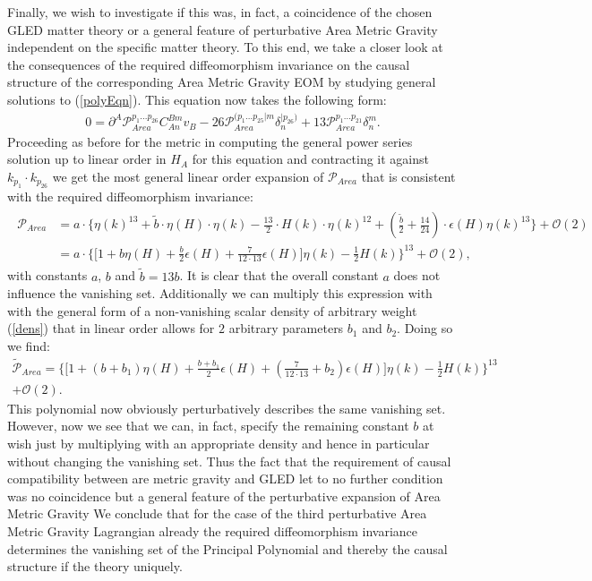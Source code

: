 \documentclass[a4paper,12pt, DIV=14, BCOR=5mm, twoside, headsepline, numbers=noenddot]{scrbook}
\begin{document}
Finally, we wish to investigate if this was, in fact, a coincidence of the chosen GLED matter theory or a general feature of perturbative Area Metric Gravity independent on the specific matter theory. To this end, we take a closer look at the consequences of the required diffeomorphism invariance on the causal structure of the corresponding Area Metric Gravity EOM by studying general solutions to (\ref{polyEqn}). This equation now takes the following form:
\begin{align}\label{AreaPolyEqn}
    0 = \partial^A \mathcal{P}_{Area}^{p_1...p_26} C_{An}^{Bm} v_B - 26\mathcal{P}_{Area}^{(p_1...p_{25}\vert m} \delta_n^{\vert p_{26})} + 13 \mathcal{P}_{Area}^{p_1...p_21} \delta^m_n.
\end{align}
Proceeding as before for the metric in computing the general power series solution up to linear order in $H_A$ for this equation and contracting it against $k_{p_1} \cdot k_{p_{26}}$ we get the most general linear order expansion of $\mathcal{P}_{Area}$ that is consistent with the required diffeomorphism invariance:
\begin{align}
\begin{aligned}
    \mathcal{P}_{Area} &= a \cdot \bigl \{  \eta(k)^{13} + \tilde{b} \cdot \eta(H) \cdot \eta(k) - \frac{13}{2} \cdot  H(k) \cdot \eta(k)^{12} + (\frac{\tilde{b}}{2}+\frac{14}{24}) \cdot \epsilon(H) \eta(k)^{13}  \bigr \} + \mathcal{O}(2)\\
    &=a \cdot \bigl\{  \bigl[ 1 + b \eta(H) + \frac{b}{2} \epsilon(H) +  \frac{7}{12\cdot13} \epsilon(H) \bigr] \eta(k) - \frac{1}{2} H(k)       \bigr\}^{13} + \mathcal{O}(2),
\end{aligned}
\end{align}
with constants $a$, $b$ and $\tilde{b} = 13b$. It is clear that the overall constant $a$ does not influence the vanishing set. Additionally we can multiply this expression with with the general form of a non-vanishing scalar density of arbitrary weight (\ref{dens}) that in linear order allows for $2$ arbitrary parameters $b_1$ and $b_2$. Doing so we find:
\begin{multline}
    \tilde{\mathcal{P}}_{Area} = \bigl\{  \bigl[ 1 + (b+ b_1) \eta(H) + \frac{b+b_1}{2} \epsilon(H) +  (\frac{7}{12\cdot13}+b_2) \epsilon(H) \bigr] \eta(k) - \frac{1}{2} H(k)       \bigr\}^{13} \\
    + \mathcal{O}(2).
\end{multline}
This polynomial now obviously perturbatively describes the same vanishing set. However, now we see that we can, in fact, specify the remaining constant $b$ at wish just by multiplying with an appropriate density and hence in particular without changing the vanishing set. 
Thus the fact that the requirement of causal compatibility between are metric gravity and GLED let to no further condition was no coincidence but a general feature of the perturbative expansion of Area Metric Gravity
We conclude that for the case of the third perturbative Area Metric Gravity Lagrangian already the required diffeomorphism invariance determines the vanishing set of the Principal Polynomial and thereby the causal structure if the theory uniquely. 
\end{document}
